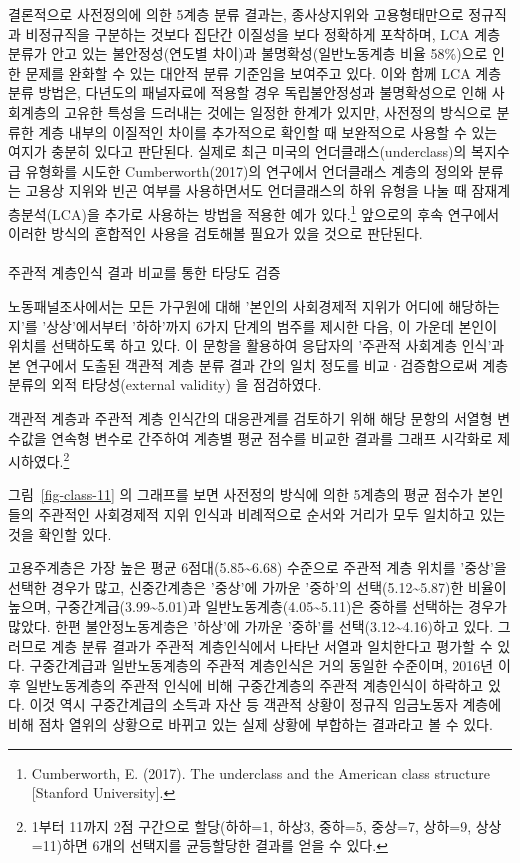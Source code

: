 \documentclass[
  letterpaper,
  DIV=11,
  numbers=noendperiod]{scrartcl}
\makeatletter
\let\oldparagraph\paragraph
\renewcommand{\paragraph}{
    \@ifstar
      \xxxParagraphStar
      \xxxParagraphNoStar
  }
\newcommand{\xxxParagraphStar}[1]{\oldparagraph*{#1}\mbox{}}
\newcommand{\xxxParagraphNoStar}[1]{\oldparagraph{#1}\mbox{}}
\makeatother
\begin{document}
결론적으로 사전정의에 의한 5계층 분류 결과는, 종사상지위와
고용형태만으로 정규직과 비정규직을 구분하는 것보다 집단간 이질성을 보다
정확하게 포착하며, LCA 계층 분류가 안고 있는 불안정성(연도별 차이)과
불명확성(일반노동계층 비율 58\%)으로 인한 문제를 완화할 수 있는 대안적
분류 기준임을 보여주고 있다. 이와 함께 LCA 계층분류 방법은, 다년도의
패널자료에 적용할 경우 독립불안정성과 불명확성으로 인해 사회계층의
고유한 특성을 드러내는 것에는 일정한 한계가 있지만, 사전정의 방식으로
분류한 계층 내부의 이질적인 차이를 추가적으로 확인할 때 보완적으로
사용할 수 있는 여지가 충분히 있다고 판단된다. 실제로 최근 미국의
언더클래스(underclass)의 복지수급 유형화를 시도한 Cumberworth(2017)의
연구에서 언더클래스 계층의 정의와 분류는 고용상 지위와 빈곤 여부를
사용하면서도 언더클래스의 하위 유형을 나눌 때 잠재계층분석(LCA)을 추가로
사용하는 방법을 적용한 예가 있다.\footnote{Cumberworth, E. (2017). The
  underclass and the American class structure {[}Stanford University{]}.}
앞으로의 후속 연구에서 이러한 방식의 혼합적인 사용을 검토해볼 필요가
있을 것으로 판단된다.

\paragraph{주관적 계층인식 결과 비교를 통한 타당도
검증}\label{uxc8fcuxad00uxc801-uxacc4uxce35uxc778uxc2dd-uxacb0uxacfc-uxbe44uxad50uxb97c-uxd1b5uxd55c-uxd0c0uxb2f9uxb3c4-uxac80uxc99d}

노동패널조사에서는 모든 가구원에 대해 '본인의 사회경제적 지위가 어디에
해당하는지'를 '상상'에서부터 '하하'까지 6가지 단계의 범주를 제시한 다음,
이 가운데 본인이 위치를 선택하도록 하고 있다. 이 문항을 활용하여
응답자의 '주관적 사회계층 인식'과 본 연구에서 도출된 객관적 계층 분류
결과 간의 일치 정도를 비교·검증함으로써 계층 분류의 외적 타당성(external
validity) 을 점검하였다.

객관적 계층과 주관적 계층 인식간의 대응관계를 검토하기 위해 해당 문항의
서열형 변수값을 연속형 변수로 간주하여 계층별 평균 점수를 비교한 결과를
그래프 시각화로 제시하였다.\footnote{1부터 11까지 2점 구간으로
  할당(하하=1, 하상3, 중하=5, 중상=7, 상하=9, 상상=11)하면 6개의
  선택지를 균등할당한 결과를 얻을 수 있다.}

그림~\ref{fig-class-11} 의 그래프를 보면 사전정의 방식에 의한 5계층의
평균 점수가 본인들의 주관적인 사회경제적 지위 인식과 비례적으로 순서와
거리가 모두 일치하고 있는 것을 확인할 있다.

고용주계층은 가장 높은 평균 6점대(5.85\textasciitilde6.68) 수준으로
주관적 계층 위치를 '중상'을 선택한 경우가 많고, 신중간계층은 '중상'에
가까운 '중하'의 선택(5.12\textasciitilde5.87)한 비율이 높으며,
구중간계급(3.99\textasciitilde5.01)과
일반노동계층(4.05\textasciitilde5.11)은 중하를 선택하는 경우가 많았다.
한편 불안정노동계층은 '하상'에 가까운 '중하'를
선택(3.12\textasciitilde4.16)하고 있다. 그러므로 계층 분류 결과가 주관적
계층인식에서 나타난 서열과 일치한다고 평가할 수 있다. 구중간계급과
일반노동계층의 주관적 계층인식은 거의 동일한 수준이며, 2016년 이후
일반노동계층의 주관적 인식에 비해 구중간계층의 주관적 계층인식이
하락하고 있다. 이것 역시 구중간계급의 소득과 자산 등 객관적 상황이
정규직 임금노동자 계층에 비해 점차 열위의 상황으로 바뀌고 있는 실제
상황에 부합하는 결과라고 볼 수 있다.
\end{document}
